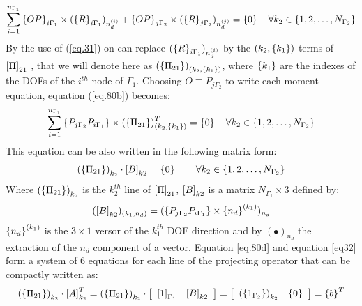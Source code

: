 \begin{eqnarray}
\label{eq.80b}
\begin{aligned}
\sum_{i=1}^{n_{\Gamma_1}}\left\lbrace{OP}\right \rbrace_{i\Gamma_1}\times (\left\lbrace{R}\right \rbrace_{i\Gamma_1})_{n_d^{(i)}}+\left\lbrace{OP}\right \rbrace_{j\Gamma_2}\times (\left\lbrace{R}\right \rbrace_{j\Gamma_2})_{n_d^{(j)}}=\left\lbrace{0}\right \rbrace \quad \forall k_2\in \lbrace1,2,\dots,N_{\Gamma_2} \rbrace
\end{aligned}
\end{eqnarray}
By the use of (\ref{eq.31}) on can replace $(\left\lbrace{R}\right \rbrace_{i\Gamma_1})_{n_d^{(i)}}$ by the $(k_2,\left\lbrace{k_1}\right \rbrace)$ terms of $\left[{\Pi}\right]_{21}$ , that we will denote here as $\left(\left\lbrace{\Pi_{21}}\right \rbrace\right)_{(k_2,\left\lbrace{k_1}\right \rbrace)}$, where   $\left\lbrace{k_1}\right \rbrace$ are the indexes of the DOFs of the $i^{th}$ node of $\Gamma_1$. Choosing $O \equiv P_{j\Gamma_2} $ to write each moment equation, equation (\ref{eq.80b}) becomes:
\begin{eqnarray}
\label{eq.80c}
\begin{aligned}
\sum_{i=1}^{n_{\Gamma_1}}\left\lbrace{P_{j\Gamma_2}P_{i\Gamma_1}}\right \rbrace\times \left(\left\lbrace{\Pi_{21}}\right \rbrace\right)_{(k_2,\left\lbrace{k_1}\right \rbrace)}^T=\left\lbrace{0}\right \rbrace \quad \forall k_2\in \lbrace1,2,\dots,N_{\Gamma_2} \rbrace
\end{aligned}
\end{eqnarray}
This equation can be also written in the following matrix form:
\begin{eqnarray}
\label{eq.80d}
\left(\left\lbrace{\Pi_{21}}\right \rbrace\right)_{k_2}\cdot\left[{B}\right]_{k2}=\left\lbrace{0}\right \rbrace \qquad \forall k_2\in \lbrace1,2,\dots,N_{\Gamma_2} \rbrace
\end{eqnarray}
Where $\left(\left\lbrace{\Pi_{21}}\right \rbrace\right)_{k_2}$ is the $k_2^{th}$ line of $\left[{\Pi}\right]_{21}$, $\left[{B}\right]_{k2}$ is a matrix $N_{\Gamma_1}\times3$ defined by:
\begin{eqnarray}
\label{eq.80e}
(\left[{B}\right]_{k2})_{(k_1,n_d)}=(\left\lbrace{P_{j\Gamma_2}P_{i\Gamma_1}}\right \rbrace\times\left\lbrace{n_d}\right \rbrace^{(k_1)})_{n_d}
\end{eqnarray}
 $\left\lbrace{n_d}\right \rbrace^{(k_1)}$ is the $3\times1$ versor of the $k_1^{th}$ DOF direction and by $(\bullet)_{n_d}$ the extraction of the  ${n_d}$ component of a vector. Equation \ref{eq.80d} and equation \ref{eq32} form a system of 6 equations for each line of the projecting operator that can be compactly written as:
 \begin{equation}
 \label{eq.80f}
 \left(\left\lbrace{\Pi_{21}}\right \rbrace\right)_{k_2}\cdot\left[{A}\right]_{k_2}^T=\left(\left\lbrace{\Pi_{21}}\right \rbrace\right)_{k_2}\cdot\left[
 \begin{array}{c c}
   \left[{1}\right]_{\Gamma_1}&
   \left[{B}\right]_{k2}
 \end{array}
 \right]=\left[\begin{array}{c c}
   \left(\left\lbrace{1_{\Gamma_2}}\right \rbrace\right)_{k_2}&
   \left\lbrace{0}\right \rbrace
 \end{array}
 \right]=\left\lbrace{b}\right \rbrace^T
 \end{equation}
